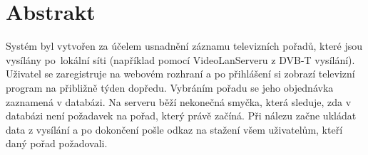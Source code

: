 \documentclass[11pt,twoside,a4paper]{dp_format}%
\begin{document}
\chapter*{Abstrakt}
Systém byl vytvořen za účelem usnadnění záznamu televizních pořadů, které jsou vysílány po~lokální síti (například pomocí VideoLanServeru z DVB-T vysílání). Uživatel se zaregistruje na webovém rozhraní a po přihlášení si zobrazí televizní program na přibližně týden dopředu. Vybráním pořadu se jeho objednávka zaznamená v databázi. Na serveru běží nekonečná smyčka, která sleduje, zda v databázi není požadavek na pořad, který právě začíná. Při nálezu začne ukládat data z vysílání a po dokončení pošle odkaz na stažení všem uživatelům, kteří daný pořad požadovali.
\cleardoublepage%

\parskip 0pt
\tableofcontents
\cleardoublepage%

\listoffigures
{}
\cleardoublepage%

\listoftables
{}
\cleardoublepage%

\parskip 10pt
\mainbodystarts







\cleardoublepage




\cleardoublepage

\appendix

\cleardoublepage


\cleardoublepage
\end{document}

